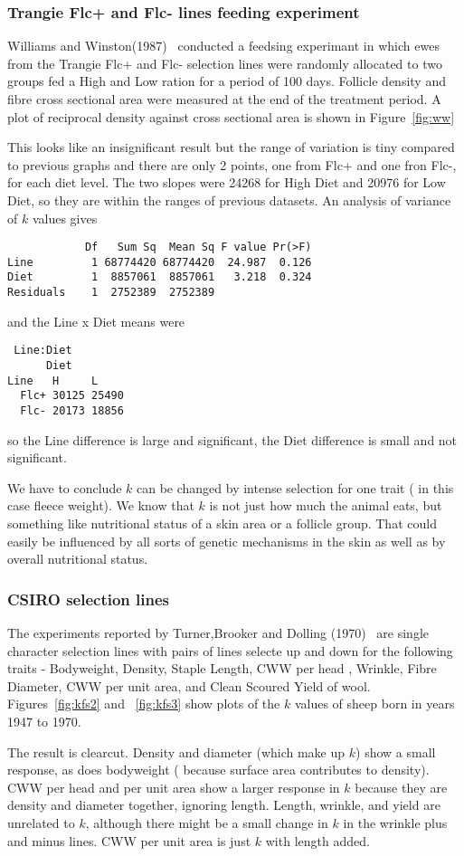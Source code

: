 \documentclass[titlepage]{article}  %
\begin{document}
\clearpage
\subsubsection{Trangie Flc+ and Flc- lines feeding experiment}
Williams and Winston(1987)~\cite{will:87} conducted a feedsing experimant in which ewes from the Trangie Flc+ and Flc- selection lines were randomly allocated to two groups fed a High and  Low ration for a period of 100 days. Follicle density and fibre cross sectional area were measured at the end of the treatment period. A plot of reciprocal density against cross sectional area is shown in Figure~\ref{fig:ww}

This looks like an insignificant result but the range of variation is tiny compared to previous graphs and there are only 2 points, one from Flc+ and one fron Flc-, for each diet level. The two slopes were  24268 for High Diet and 20976 for Low Diet, so they are within the ranges of previous datasets. An analysis of variance of $k$ values gives 
\begin{verbatim}
            Df   Sum Sq  Mean Sq F value Pr(>F)
Line         1 68774420 68774420  24.987  0.126
Diet         1  8857061  8857061   3.218  0.324
Residuals    1  2752389  2752389               
\end{verbatim}
and the Line x Diet means were
\begin{verbatim}
 Line:Diet 
      Diet
Line   H     L    
  Flc+ 30125 25490
  Flc- 20173 18856
\end{verbatim}
so the Line difference is large and significant, the Diet difference is small and not significant.

We have to conclude $k$ can be changed by intense selection for one trait ( in this case fleece weight). We know that $k$ is not just how much the animal eats, but something like nutritional status of a skin area or a follicle group.  That could easily be influenced by all sorts of genetic mechanisms in the skin as well as by overall nutritional status.


\clearpage
\subsubsection{CSIRO selection lines}
The experiments reported by Turner,Brooker and Dolling (1970)~\cite{turn:70} are single character selection lines with pairs of lines selecte up and down for the following traits - Bodyweight, Density, Staple Length, CWW per head , Wrinkle, Fibre Diameter, CWW per unit area, and Clean Scoured Yield of wool. Figures~\ref{fig:kfs2} and ~\ref{fig:kfs3} show plots of the $k$ values of sheep born in years 1947 to 1970.


The result is clearcut. Density and diameter (which make up $k$) show a small response, as does bodyweight ( because surface area contributes to density). CWW per head and per unit area show a larger response in $k$ because they are density and diameter together, ignoring length. Length, wrinkle, and yield are unrelated to $k$, although there might be a small change in $k$ in the wrinkle plus and minus lines. CWW per unit area is just $k$ with length added.
\end{document}
